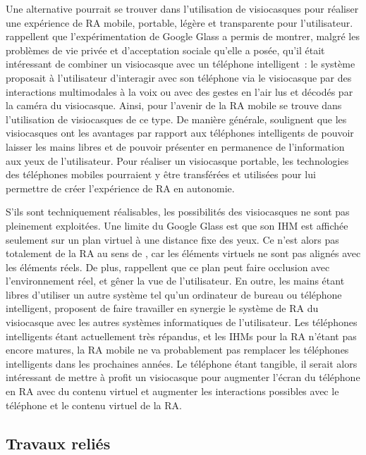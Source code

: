 Une alternative pourrait se trouver dans l'utilisation de visiocasques pour réaliser une expérience de RA mobile, portable, légère et transparente pour l'utilisateur. \citet{KoelleKranzMoeller2015} rappellent que l'expérimentation de Google Glass a permis de montrer, malgré les problèmes de vie privée et d'acceptation sociale qu'elle a posée, qu'il était intéressant de combiner un visiocasque avec un téléphone intelligent~: le système proposait à l'utilisateur d'interagir avec son téléphone via le visiocasque par des interactions multimodales à la voix ou avec des gestes en l'air lus et décodés par la caméra du visiocasque. Ainsi, pour \citet{HuangHuiPeyloEtAl2013} l'avenir de la RA mobile se trouve dans l'utilisation de visiocasques de ce type. De manière générale, \citet{SerranoEnsYangEtAl2015} soulignent que les visiocasques ont les avantages par rapport aux téléphones intelligents de pouvoir laisser les mains libres et de pouvoir présenter en permanence de l'information aux yeux de l'utilisateur. Pour réaliser un visiocasque portable, les technologies des téléphones mobiles pourraient y être transférées et utilisées pour lui permettre de créer l'expérience de RA en autonomie.

S'ils sont techniquement réalisables, les possibilités des visiocasques ne sont pas pleinement exploitées. Une limite du Google Glass est que son IHM est affichée seulement sur un plan virtuel à une distance fixe des yeux. Ce n'est alors pas totalement de la RA au sens de \citet{AzumaBaillotBehringerEtAl2001}, car les éléments virtuels ne sont pas alignés avec les éléments réels. De plus, \citet{SerranoEnsYangEtAl2015} rappellent que ce plan peut faire occlusion avec l'environnement réel, et gêner la vue de l'utilisateur. En outre, les mains étant libres d'utiliser un autre système tel qu'un ordinateur de bureau ou téléphone intelligent, \citet{SerranoEnsYangEtAl2015b} proposent de faire travailler en synergie le système de RA du visiocasque avec les autres systèmes informatiques de l'utilisateur. Les téléphones intelligents étant actuellement très répandus, et les IHMs pour la RA n'étant pas encore matures, la RA mobile ne va probablement pas remplacer les téléphones intelligents dans les prochaines années. Le téléphone étant tangible, il serait alors intéressant de mettre à profit un visiocasque pour augmenter l'écran du téléphone en RA avec du contenu virtuel et augmenter les interactions possibles avec le téléphone et le contenu virtuel de la RA.


\subsection*{Travaux reliés}
